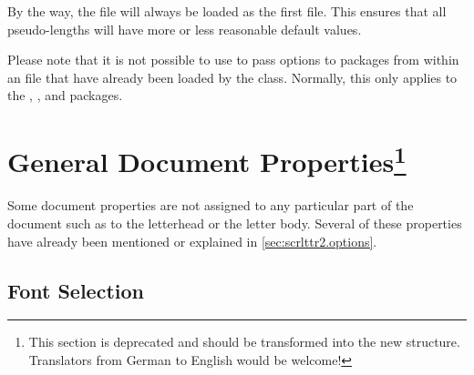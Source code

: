 By the way, the   file will always be loaded as
the first  file. This ensures that all pseudo-lengths will
have more or less reasonable default values.

Please note that it is not possible to use 
to pass options to packages from within an  file that have
already been loaded by the class. Normally, this only applies to the
, , and  packages.
%
%

\section{General Document Properties\protect\footnote{This section is
  deprecated and should be transformed into the new structure. Translators
  from German to English would be welcome!}}
\label{sec:scrlttr2.general}

Some document properties are not assigned to any particular part of
the document such as to the letterhead or the letter body. Several of
these properties have already been mentioned or explained in
\autoref{sec:scrlttr2.options}.


\subsection{Font Selection}
\label{sec:scrlttr2.font}

